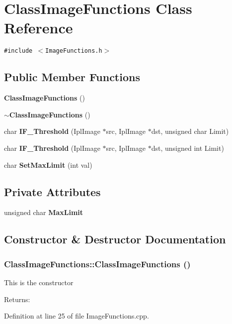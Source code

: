 \section{Class\-Image\-Functions Class Reference}
\label{classClassImageFunctions}
{\tt \#include $<$Image\-Functions.h$>$}

\subsection*{Public Member Functions}
\begin{CompactItemize}
\item 
{\bf Class\-Image\-Functions} ()
\item 
{\bf $\sim$Class\-Image\-Functions} ()
\item 
char {\bf IF\_\-Threshold} (Ipl\-Image $\ast$src, Ipl\-Image $\ast$dst, unsigned char Limit)
\item 
char {\bf IF\_\-Threshold} (Ipl\-Image $\ast$src, Ipl\-Image $\ast$dst, unsigned int Limit)
\item 
char {\bf Set\-Max\-Limit} (int val)
\end{CompactItemize}
\subsection*{Private Attributes}
\begin{CompactItemize}
\item 
unsigned char {\bf Max\-Limit}
\end{CompactItemize}


\subsection{Constructor \& Destructor Documentation}
\subsubsection{\setlength{\rightskip}{0pt plus 5cm}Class\-Image\-Functions::Class\-Image\-Functions ()}\label{classClassImageFunctions_ClassImageFunctionsa0}


This is the constructor \begin{Desc}
\item[Returns:]\end{Desc}
Definition at line 25 of file Image\-Functions.cpp.

